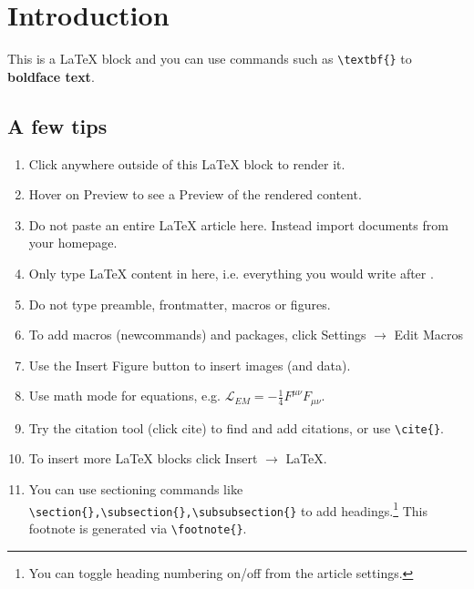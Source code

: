 \section{Introduction}

This is a LaTeX block and you can use commands such as \verb|\textbf{}| to \textbf{boldface text}.

\subsection{A few tips}

\begin{enumerate}
\item Click anywhere outside of this LaTeX block to render it.
\item Hover on Preview to see a Preview of the rendered content.
\item Do not paste an entire LaTeX article here. Instead import documents from your homepage.
\item Only type LaTeX content in here, i.e. everything you would write after \verb||.
\item Do not type preamble, frontmatter, macros or figures.
\item To add macros (newcommands) and packages, click Settings $\rightarrow$ Edit Macros
\item Use the Insert Figure button to insert images (and data).
\item Use math mode for equations, e.g. $\mathcal L_{EM}=-\frac14F^{\mu\nu}F_{\mu\nu}$.
\item Try the citation tool (click cite) to find and add citations, or use \verb|\cite{}|.
\item To insert more LaTeX blocks click Insert $\rightarrow$ LaTeX.
\item You can use sectioning commands like \verb|\section{},\subsection{},\subsubsection{}| to add headings.\footnote{You can toggle heading numbering on/off from the article settings.} This footnote is generated via \verb|\footnote{}|.
\end{enumerate}